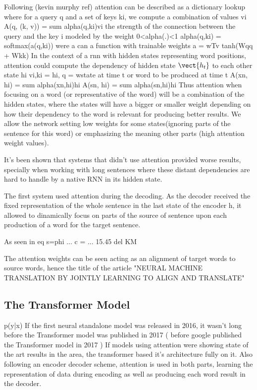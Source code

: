 \documentclass[11pt,english,listoffigures,listoftables]{tfgetsinf}
\begin{document}
Following (kevin murphy ref) attention can be described as a dictionary lookup where for a query q and a set of keys ki, we compute a combination of values vi
A(q, (k, v)) = sum alpha(q,ki)vi
the strength of the connection between the query and the key i modeled by the weight 0<alpha(.)<1
alpha(q,ki) = softmax(a(q,ki))
were a can a function with trainable weights
a = wTv tanh(Wqq + Wkk) 
In the context of a rnn with hidden states representing word positions, attention could compute the dependency of hidden state $\vect{h_t}$ to each other state hi
vi,ki = hi, q = wstate at time t or word to be produced at time t
A(xn, hi) = sum alpha(xn,hi)hi
A(sn, hi) = sum alpha(sn,hi)hi
Thus attention when focusing on a word (or representative of the word) will be a combination of the hidden states, where the states will have a bigger or smaller weight depending on how their dependency to the word is relevant for producing better results. We allow the network setting low weights for some states(ignoring parts of the sentence for this word) or emphasizing the meaning other parts (high attention weight values).

It's been shown that systems that didn't use attention provided worse results, specially when working with long sentences where these distant dependencies are hard to handle by a native RNN in its hidden state. 

The first system used attention during the decoding. As the decoder received the fixed representation of the whole sentence in the last state of the encoder h, it allowed to dinamically focus on parts of the source of sentence upon each production of a word for the target sentence.

As seen in eq s=phi ...
c = ... 15.45 del KM

The attention weights can be seen acting as an alignment of target words to source words, hence the title of the article "NEURAL MACHINE TRANSLATION
BY JOINTLY LEARNING TO ALIGN AND TRANSLATE"


\subsection{The Transformer Model}
p(y|x)
If the first neural standalone model was released in 2016, it wasn't long before the Transformer model was published in 2017 
( before google published the Transformer model in 2017 )
If models using attention were showing state of the art results in the area, the transformer based it's architecture fully on it.
Also following an encoder decoder scheme, attention is used in both parts, learning the representation of data during encoding as well as producing each word result in the decoder.
\end{document}
